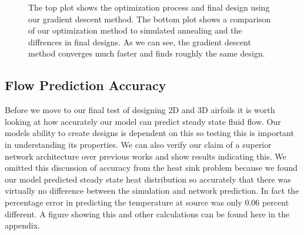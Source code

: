 \documentclass{article} %
\begin{document}
\begin{figure}[h]
\begin{center}
\end{center}
\label{heat_sink_optimization}
\caption{The top plot shows the optimization process and final design using our gradient descent method. The bottom plot shows a comparison of our optimization method to simulated annealing and the diffrences in final designs. As we can see, the gradient descent method converges much faster and finds roughly the same design. }
\end{figure}

\begin{figure}[h]
\begin{center}
\end{center}
\end{figure}


\subsection{Flow Prediction Accuracy}

Before we move to our final test of designing 2D and 3D airfoils it is worth looking at how accurately our model can predict steady state fluid flow. Our models ability to create designs is dependent on this so testing this is important in understanding its properties. We can also verify our claim of a superior network architecture over previous works and show results indicating this. We omitted this discussion of accuracy from the heat sink problem because we found our model predicted steady state heat distribution so accurately that there was virtually no difference between the simulation and network prediction. In fact the percentage error in predicting the temperature at source was only 0.06 percent different. A figure showing this and other calculations can be found here in the appendix.
\end{document}
